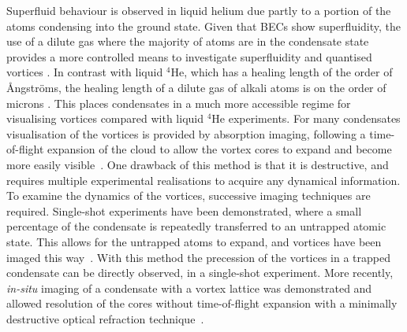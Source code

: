 Superfluid behaviour is observed in liquid helium due partly to a portion of the atoms condensing into the ground state. Given that BECs show superfluidity, the use of a dilute gas where the majority of atoms are in the condensate state provides a more controlled means to investigate superfluidity and quantised vortices \cite{BK:Ueda_2010,BEC:Srinivasen_pramana_2006,Vtx:Tsubota_arxiv_2010,CT:Tsubota_jpsj_2008}. In contrast with liquid $^4$He, which has a healing length of the order of {\r{A}}ngstr{\"o}ms, the healing length of a dilute gas of alkali atoms is on the order of microns \cite{Vtx:Isoshima_pra_1999}. This places condensates in a much more accessible regime for visualising vortices compared with liquid $^4$He experiments. For many condensates visualisation of the vortices is provided by absorption imaging, following a time-of-flight expansion of the cloud to allow the vortex cores to expand and become more easily visible~\cite{Vtx:Raman_prl_2001,VTX:Rankonjac_pra_2016}. One drawback of this method is that it is destructive, and requires multiple experimental realisations to acquire any dynamical information. To examine the dynamics of the vortices, successive imaging techniques are required. Single-shot experiments have been demonstrated, where a small percentage of the condensate is repeatedly transferred to an untrapped atomic state. This allows for the untrapped atoms to expand, and vortices have been imaged this way~\cite{VTX:Freilich_sci_2010}. With this method the precession of the vortices in a trapped condensate can be directly observed, in a single-shot experiment. More recently, \textit{in-situ} imaging of a condensate with a vortex lattice was demonstrated and allowed resolution of the cores without time-of-flight expansion with a minimally destructive optical refraction technique~\cite{VTX:Wilson_pra_2015}.

